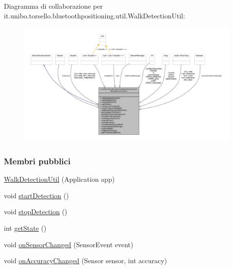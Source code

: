 Diagramma di collaborazione per it.\+unibo.\+torsello.\+bluetoothpositioning.\+util.\+Walk\+Detection\+Util\+:
\nopagebreak
\begin{figure}[H]
\begin{center}
\leavevmode
\includegraphics[width=350pt]{classit_1_1unibo_1_1torsello_1_1bluetoothpositioning_1_1util_1_1WalkDetectionUtil__coll__graph}
\end{center}
\end{figure}
\subsubsection*{Membri pubblici}
\begin{DoxyCompactItemize}
\item 
\hyperlink{classit_1_1unibo_1_1torsello_1_1bluetoothpositioning_1_1util_1_1WalkDetectionUtil_a8303363468683e172b5a7132c3ebfb99_a8303363468683e172b5a7132c3ebfb99}{Walk\+Detection\+Util} (Application app)
\item 
void \hyperlink{classit_1_1unibo_1_1torsello_1_1bluetoothpositioning_1_1util_1_1WalkDetectionUtil_a33c73b147b56ccb0d2d7523d72a5c8fa_a33c73b147b56ccb0d2d7523d72a5c8fa}{start\+Detection} ()
\item 
void \hyperlink{classit_1_1unibo_1_1torsello_1_1bluetoothpositioning_1_1util_1_1WalkDetectionUtil_a8390695e6d52a2a523b0bd74e919e616_a8390695e6d52a2a523b0bd74e919e616}{stop\+Detection} ()
\item 
int \hyperlink{classit_1_1unibo_1_1torsello_1_1bluetoothpositioning_1_1util_1_1WalkDetectionUtil_a86e38be742e0e20a92b4195d8d98a08d_a86e38be742e0e20a92b4195d8d98a08d}{get\+State} ()
\item 
void \hyperlink{classit_1_1unibo_1_1torsello_1_1bluetoothpositioning_1_1util_1_1WalkDetectionUtil_afb90996da1aa56e5a9ffcad5269eaf1c_afb90996da1aa56e5a9ffcad5269eaf1c}{on\+Sensor\+Changed} (Sensor\+Event event)
\item 
void \hyperlink{classit_1_1unibo_1_1torsello_1_1bluetoothpositioning_1_1util_1_1WalkDetectionUtil_abf46259850d7bb7dd76508f12036aecf_abf46259850d7bb7dd76508f12036aecf}{on\+Accuracy\+Changed} (Sensor sensor, int accuracy)
\end{DoxyCompactItemize}
